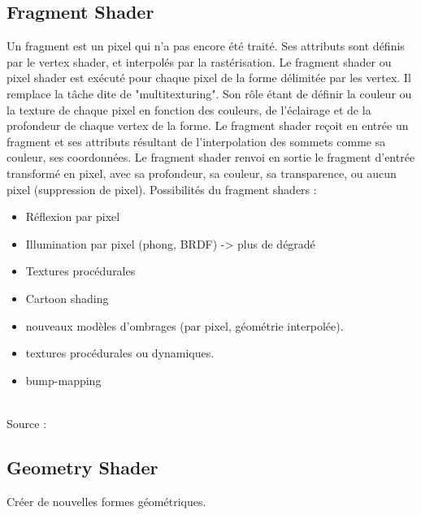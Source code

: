 \newpage

\subsection{Fragment Shader}
Un fragment est un pixel qui n’a pas encore été traité. Ses attributs sont définis par le vertex shader, et interpolés par la rastérisation.
Le fragment shader ou pixel shader est exécuté pour chaque pixel de la forme délimitée par les vertex. Il remplace la tâche dite de "multitexturing". Son rôle étant de définir la couleur ou la texture de chaque pixel en fonction des couleurs, de l’éclairage et de la profondeur de chaque vertex de la forme.
Le fragment shader reçoit en entrée un fragment et ses attributs résultant de l’interpolation des sommets comme sa couleur, ses coordonnées.
Le fragment shader renvoi en sortie le fragment d’entrée transformé en pixel, avec sa profondeur, sa couleur, sa transparence, ou aucun pixel (suppression de pixel).
Possibilités du fragment shaders :
\begin{itemize}
	\item Réflexion par pixel
	\item Illumination par pixel (phong, BRDF) -> plus de dégradé
	\item Textures procédurales
	\item Cartoon shading
	\item nouveaux modèles d’ombrages (par pixel, géométrie interpolée).
	\item textures procédurales ou dynamiques.
	\item bump-mapping
	\\\\
\end{itemize}


Source : \cite{shader3}

\subsection{Geometry Shader}
Créer de nouvelles formes géométriques.
\\


